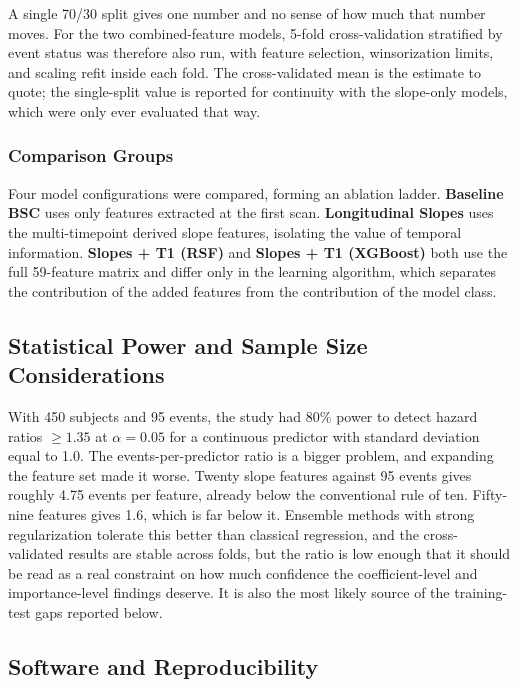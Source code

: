 \documentclass[blue]{ludusofficial}  %
\begin{document}
A single 70/30 split gives one number and no sense of how much that number moves. For the two combined-feature models, 5-fold cross-validation stratified by event status was therefore also run, with feature selection, winsorization limits, and scaling refit inside each fold. The cross-validated mean is the estimate to quote; the single-split value is reported for continuity with the slope-only models, which were only ever evaluated that way.

\subsubsection{Comparison Groups}

Four model configurations were compared, forming an ablation ladder. \textbf{Baseline BSC} uses only features extracted at the first scan. \textbf{Longitudinal Slopes} uses the multi-timepoint derived slope features, isolating the value of temporal information. \textbf{Slopes + T1 (RSF)} and \textbf{Slopes + T1 (XGBoost)} both use the full 59-feature matrix and differ only in the learning algorithm, which separates the contribution of the added features from the contribution of the model class.

\subsection{Statistical Power and Sample Size Considerations}

With 450 subjects and 95 events, the study had 80\% power to detect hazard ratios $\geq 1.35$ at $\alpha = 0.05$ for a continuous predictor with standard deviation equal to 1.0. The events-per-predictor ratio is a bigger problem, and expanding the feature set made it worse. Twenty slope features against 95 events gives roughly 4.75 events per feature, already below the conventional rule of ten. Fifty-nine features gives 1.6, which is far below it. Ensemble methods with strong regularization tolerate this better than classical regression, and the cross-validated results are stable across folds, but the ratio is low enough that it should be read as a real constraint on how much confidence the coefficient-level and importance-level findings deserve. It is also the most likely source of the training-test gaps reported below.

\subsection{Software and Reproducibility}
\end{document}

